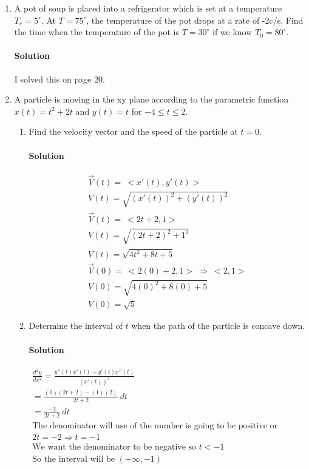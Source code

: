 \documentclass[MATH-115-Notes.tex]{subfiles}
\begin{document}
\begin{enumerate}
    \newpage


    \item A pot of soup is placed into a refrigerator which is set at a temperature \(T_e = 5^{\circ}\). At $T = 75^{\circ}$, the temperature of the pot drops at a rate of -2c/s. Find the time when the temperature of the pot is $T = 30^{\circ}$ if we know $T_0 = 80^{\circ}$.
    \paragraph*{Solution} I solved this on page 20.


    \item A particle is moving in the xy plane according to the parametric function \(x(t) = t^2 + 2t\) and \(y(t) = t\) for \(-4 \leq t \leq 2\).
    \begin{enumerate}
        \item Find the velocity vector and the speed of the particle at $t=0$.
        \paragraph*{Solution}
        \begin{gather*}
            \vec{V}(t) =\ < x'(t),y'(t)>\\
            V(t) = \sqrt{(x'(t))^2 + (y'(t))^2}\\
            \vec{V}(t) =\ < 2t + 2, 1>\\
            V(t) = \sqrt{(2t + 2)^2 + 1^2}\\
            V(t) = \sqrt{4t^2 + 8t + 5}\\
            \vec{V}(0) =\ <2(0) + 2, 1>\ \Rightarrow\ <2,1>\\
            V(0) = \sqrt{4(0)^2 + 8(0) + 5}\\
            V(0) = \sqrt{5}
        \end{gather*}
        \item Determine the interval of $t$ when the path of the particle is concave down.
        \paragraph*{Solution} 
        \begin{gather*}
            \frac{d^2y}{dx^2} = \frac{y''(t)x'(t) - y'(t)x''(t)}{(x'(t))^3}\\
            = \frac{(0)(2t + 2) - (1)(2)}{2t + 2}\ dt\\
            = \frac{-2}{2t + 2}\ dt\\
            \text{The denominator will use of the number is going to be positive or negative}\\
            2t = -2 \Rightarrow t = -1\\
            \text{We want the denominator to be negative so } t < -1\\
            \text{So the interval will be } (-\infty, -1)
        \end{gather*}
    \end{enumerate}
\end{enumerate}
\newpage
\end{document}
